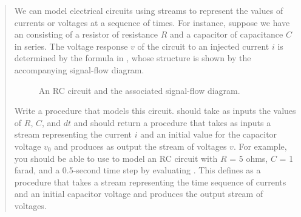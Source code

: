 \begin{quote}
 We can model electrical circuits
using streams to represent the values of currents or voltages at a sequence of
times.  For instance, suppose we have an  consisting of a
resistor of resistance \( R \) and a capacitor of capacitance \( C \) in series.
The voltage response \( v \) of the circuit to an injected current \( i \) is
determined by the formula in , whose structure is shown by the
accompanying signal-flow diagram.

\begin{figure}[tb]
\label{Figure 3.33}
\centering
\begin{comment}
\heading{Figure 3.33:} An RC circuit and the associated signal-flow diagram.

\begin{example}
  +        v        -

 ->----'\/\/\,---| |---
  i       R         C


                  / t
               1  |
 v  =  v   +  --- |  i dt  +  R i
        0      C  |
                  / 0

         +--------------+
     +-->|   scale: R   |---------------------+   |\_
     |   +--------------+                     |   |  \_
     |                                        +-->|    \   v
  i  |   +--------------+     +------------+      | add >--->
 ----+-->|  scale: 1/C  |---->|  integral  |----->|   _/
         +--------------+     +------------+      | _/
                                    |             |/
				   v
				    0
\end{example}
\end{comment}

\par\bigskip
\noindent
{} An RC circuit and the associated signal-flow diagram. 
\end{figure}

Write a procedure  that models this circuit.   should take as
inputs the values of \( R \), \( C \), and \( dt \) and should return a procedure
that takes as inputs a stream representing the current \( i \) and an initial
value for the capacitor voltage \( v_0 \) and produces as output the stream of
voltages \( v \).  For example, you should be able to use  to model an
RC circuit with \( R \) = 5 ohms, \( C \) = 1 farad, and a 0.5-second time step by
evaluating .  This defines  as a
procedure that takes a stream representing the time sequence of currents and an
initial capacitor voltage and produces the output stream of voltages.
\end{quote}

